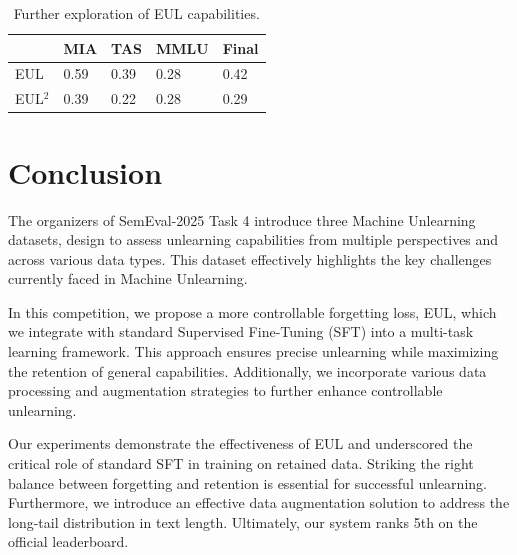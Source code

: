 \documentclass[11pt]{article}
\begin{document}
\begin{table}\footnotesize
  \centering
    \begin{tabular}{l|l|l|l|l}
    \hline
        ~ & MIA & TAS & MMLU & Final \\ \hline
        EUL & 0.59 & 0.39 & 0.28 & 0.42 \\ \hline
        EUL$^2$ & 0.39 & 0.22 & 0.28 & 0.29 \\ \hline
    \end{tabular}
  \caption{Further exploration of EUL capabilities.}
  \label{tab:accents}
\end{table}









\section{Conclusion} 
The organizers of SemEval-2025 Task 4 introduce three Machine Unlearning datasets, design to assess unlearning capabilities from multiple perspectives and across various data types. This dataset effectively highlights the key challenges currently faced in Machine Unlearning.


In this competition, we propose a more controllable forgetting loss, EUL, which we integrate with standard Supervised Fine-Tuning (SFT) into a multi-task learning framework. This approach ensures precise unlearning while maximizing the retention of general capabilities. Additionally, we incorporate various data processing and augmentation strategies to further enhance controllable unlearning.

Our experiments demonstrate the effectiveness of EUL and underscored the critical role of standard SFT in training on retained data. Striking the right balance between forgetting and retention is essential for successful unlearning. Furthermore, we introduce an effective data augmentation solution to address the long-tail distribution in text length. Ultimately, our system ranks 5th on the official leaderboard.
\end{document}
